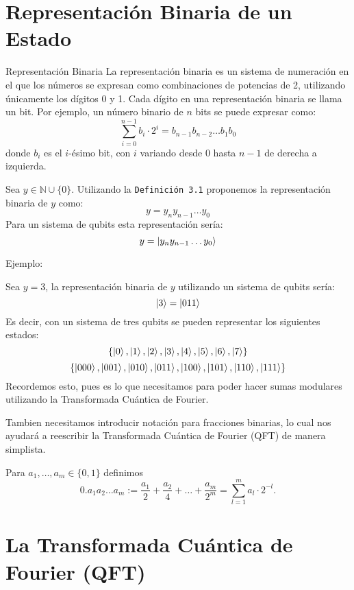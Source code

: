 \documentclass{article}
\begin{document}
\section{Representación Binaria de un Estado}
\begin{mydef}{Representación Binaria}{}
La representación binaria es un sistema de numeración en el que los números se expresan como combinaciones de potencias de 2, utilizando únicamente los dígitos 0 y 1. Cada dígito en una representación binaria se llama un bit. Por ejemplo, un número binario de \( n \) bits se puede expresar como:
\[
 \sum_{i=0}^{n-1} b_i \cdot 2^i = b_{n-1}b_{n-2}\ldots b_1b_0 
\]
donde \( b_i \) es el \( i \)-ésimo bit, con \( i \) variando desde 0 hasta \( n-1 \) de derecha a izquierda.
\end{mydef}
Sea \(y\in \mathbb{N}\cup\{0\}\). Utilizando la \texttt{Definición 3.1} proponemos la representación binaria
de \(y\) como: 
\[y= y_{n}y_{n-1}\ldots y_{0}\]
Para un sistema de qubits esta representación sería:
\[y= \ket{y_{n}y_{n-1}\ldots y_{0}}\]
\begin{mdframed}[linewidth=1pt, linecolor=orange]
    Ejemplo:

    \noindent Sea \(y= 3\), la representación binaria de \(y\) utilizando un sistema de qubits sería:
    \[\ket{3} = \ket{011}\]
    Es decir, con un sistema de tres qubits se pueden representar los siguientes estados:
    \[\{\ket{0},\ket{1},\ket{2},\ket{3},\ket{4},\ket{5},\ket{6},\ket{7}\}\]
    \[\{\ket{000},\ket{001},\ket{010},\ket{011},\ket{100},\ket{101},\ket{110},\ket{111}\}\]
    Recordemos esto, pues es lo que necesitamos para poder hacer sumas modulares utilizando la
    Transformada Cuántica de Fourier.
\end{mdframed}

Tambien necesitamos introducir notación para fracciones binarias,
lo cual nos ayudará a reescribir la Transformada Cuántica de Fourier (QFT)
de manera simplista.
\begin{mydef}{}{}
    Para $a_1, \ldots, a_m \in \{0, 1\}$ definimos
\[
0.a_1a_2 \ldots a_m := \frac{a_1}{2} + \frac{a_2}{4} + \ldots + \frac{a_m}{2^m} =
\sum_{l=1}^{m} a_l \cdot 2^{-l}.
\]
\end{mydef}
\section{La Transformada Cuántica de Fourier (QFT)}
\end{document}
